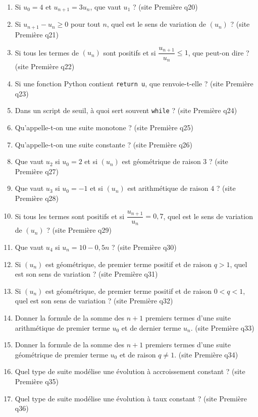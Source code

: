 \documentclass[11pt,a4paper]{article}
\newcommand{\sourceq}[1]{ {\scriptsize\textcolor{bleufonce}{(site Première q#1)}}}
\newcommand{\code}[1]{\texttt{#1}}
\newcounter{question}
\newenvironment{blocquestions}[1]{%
  \begin{tcolorbox}[enhanced,breakable,colback=bleuclair,colframe=bleufonce,boxrule=0.6pt,arc=2mm,left=2mm,right=2mm,top=2mm,bottom=1.5mm,title={\bfseries #1},coltitle=white,colbacktitle=bleufonce,before skip=3mm,after skip=3mm, fontupper=\large]
  \large
  \begin{enumerate}[leftmargin=*,label=\textbf{\arabic*.},itemsep=0.82em,topsep=0.5em]
  \setcounter{enumi}{\value{question}}
}{%
  \setcounter{question}{\value{enumi}}
  \end{enumerate}
  \end{tcolorbox}
}
\begin{document}
\begin{blocquestions}{Questions flash -- Suites}
  \item Si $u_0=4$ et $u_{n+1}=3u_n$, que vaut $u_1$ ? \sourceq{20}
  \item Si $u_{n+1}-u_n\geq0$ pour tout $n$, quel est le sens de variation de $(u_n)$ ? \sourceq{21}
  \item Si tous les termes de $(u_n)$ sont positifs et si $\dfrac{u_{n+1}}{u_n}\leq1$, que peut-on dire ? \sourceq{22}
  \item Si une fonction Python contient \code{return u}, que renvoie-t-elle ? \sourceq{23}
  \item Dans un script de seuil, à quoi sert souvent \code{while} ? \sourceq{24}
  \item Qu'appelle-t-on une suite monotone ? \sourceq{25}
  \item Qu'appelle-t-on une suite constante ? \sourceq{26}
  \item Que vaut $u_2$ si $u_0=2$ et si $(u_n)$ est géométrique de raison $3$ ? \sourceq{27}
  \item Que vaut $u_3$ si $u_0=-1$ et si $(u_n)$ est arithmétique de raison $4$ ? \sourceq{28}
  \item Si tous les termes sont positifs et si $\dfrac{u_{n+1}}{u_n}=0{,}7$, quel est le sens de variation de $(u_n)$ ? \sourceq{29}
  \item Que vaut $u_4$ si $u_n=10-0{,}5n$ ? \sourceq{30}
  \item Si $(u_n)$ est géométrique, de premier terme positif et de raison $q>1$, quel est son sens de variation ? \sourceq{31}
  \item Si $(u_n)$ est géométrique, de premier terme positif et de raison $0<q<1$, quel est son sens de variation ? \sourceq{32}
  \item Donner la formule de la somme des $n+1$ premiers termes d'une suite arithmétique de premier terme $u_0$ et de dernier terme $u_n$. \sourceq{33}
  \item Donner la formule de la somme des $n+1$ premiers termes d'une suite géométrique de premier terme $u_0$ et de raison $q\neq1$. \sourceq{34}
  \item Quel type de suite modélise une évolution à accroissement constant ? \sourceq{35}
  \item Quel type de suite modélise une évolution à taux constant ? \sourceq{36}
\end{blocquestions}
\clearpage
\end{document}
